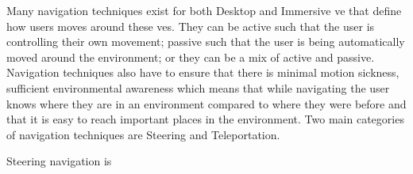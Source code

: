 %
%
%
%
%
%

Many navigation techniques exist for both Desktop and Immersive \acrfull{ve} that define how users moves around these \acrshort{ve}s. They can be active such that the user is controlling their own movement; passive such that the user is being automatically moved around the environment; or they can be a mix of active and passive. Navigation techniques also have to ensure that there is minimal motion sickness, sufficient environmental awareness which means that while navigating the user knows where they are in an environment compared to where they were before and that it is easy to reach important places in the environment. Two main categories of navigation techniques are Steering and Teleportation.

Steering navigation is 